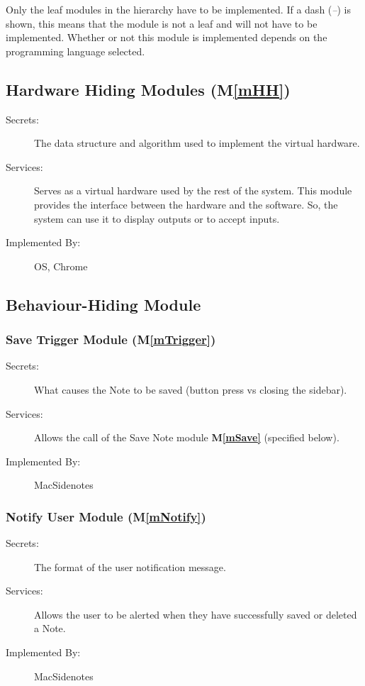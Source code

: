 \documentclass[12pt, titlepage]{article}
\newcommand{\mref}[1]{M\ref{#1}}
\begin{document}
Only the leaf modules in the
hierarchy have to be implemented. If a dash (\emph{--}) is shown, this means
that the module is not a leaf and will not have to be implemented. Whether or
not this module is implemented depends on the programming language
selected.

\subsection{Hardware Hiding Modules (\mref{mHH})}

\begin{description}
\item[Secrets:]The data structure and algorithm used to implement the virtual
  hardware.
\item[Services:]Serves as a virtual hardware used by the rest of the
  system. This module provides the interface between the hardware and the
  software. So, the system can use it to display outputs or to accept inputs.
\item[Implemented By:] OS, Chrome
\end{description}

\subsection{Behaviour-Hiding Module}

\subsubsection{Save Trigger Module (\mref{mTrigger})}

\begin{description}
\item[Secrets:]What causes the Note to be saved (button press vs closing the 
sidebar).
\item[Services:]Allows the call of the Save Note module \textbf{\mref{mSave}} 
(specified below).
\item[Implemented By:] MacSidenotes
\end{description}

\subsubsection{Notify User Module (\mref{mNotify})}

\begin{description}
\item[Secrets:]The format of the user notification message.
\item[Services:]Allows the user to be alerted when they have successfully saved 
or deleted a Note.
\item[Implemented By:] MacSidenotes
\end{description}
\end{document}
